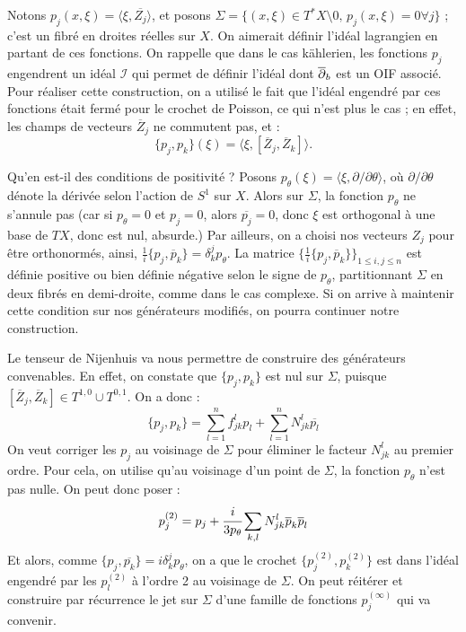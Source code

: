 Notons $p_j(x,\xi)= \langle \xi, \overline{Z_j} \rangle$, et posons
$\Sigma = \{(x,\xi) \in T^*X\setminus 0,\,p_j(x,\xi)=0 \forall j\}$ ;
c'est un fibré en droites réelles sur $X$. On aimerait définir l'idéal
lagrangien en partant de ces fonctions. On rappelle que dans le cas
kählerien, les fonctions $p_j$ engendrent un idéal $\mathcal{I}$ qui
permet de définir l'idéal dont $\overline{\partial}_b$ est un OIF associé. Pour réaliser
cette construction, on a utilisé le fait que l'idéal engendré par ces
fonctions était fermé pour le crochet de Poisson, ce qui n'est plus le
cas ; en effet, les champs de vecteurs $\overline{Z}_j$ ne commutent
pas, et :
\begin{equation*}
	\{p_j,p_k\}(\xi) = \langle \xi,
        [\overline{Z}_j,\overline{Z}_k]\rangle.
\end{equation*}

Qu'en est-il des conditions de positivité ? Posons $p_{\theta}(\xi) =
\langle \xi, \partial/\partial \theta \rangle$, où $\partial/\partial
\theta$ dénote la dérivée selon l'action de $S^1$ sur $X$. Alors sur
$\Sigma$, la fonction $p_{\theta}$ ne s'annule pas (car si
$p_{\theta}=0$ et $p_j=0$, alors $\overline{p_j}=0$, donc $\xi$ est
orthogonal à une base de $TX$, donc est nul, absurde.) Par ailleurs,
on a choisi nos vecteurs $Z_j$ pour être orthonormés, ainsi, $\frac 1i
\{p_j,\overline{p}_k\}=\delta^j_kp_{\theta}$. La matrice $\{\frac 1i
\{p_j,\overline{p}_k\}\}_{1\leq i,j\leq n}$ est définie positive ou bien définie négative selon le signe de $p_\theta$, partitionnant $\Sigma$ en deux fibrés en demi-droite, comme dans le cas complexe. Si on arrive à maintenir cette condition sur nos générateurs modifiés, on pourra continuer notre construction.

Le tenseur de Nijenhuis va nous permettre de construire des
générateurs convenables. En effet, on constate que $\{p_j,p_k\}$ est
nul sur $\Sigma$, puisque $[\overline{Z}_j,\overline{Z}_k]\in
T^{1,0}\cup T^{0,1}$. On a donc :
\begin{equation*}
	\{p_j,p_k\} = \sum_{l=1}^nf^l_{jk}p_l + \sum_{l=1}^{n}N^l_{jk}\overline{p_l}
\end{equation*}
On veut corriger les $p_j$ au voisinage de $\Sigma$ pour éliminer le facteur $N^l_{jk}$ au premier ordre. Pour cela, on utilise qu'au voisinage d'un point de $\Sigma$, la fonction $p_{\theta}$ n'est pas nulle. On peut donc poser :
\begin{equation*}
	p_j^{(2)} = p_j + \cfrac{i}{3p_{\theta}}\sum_{k,l}N^l_{jk}\overline{p}_k\overline{p}_l
\end{equation*}
Et alors, comme $\{p_j,\overline{p_k}\}=i\delta^j_k p_{\theta}$, on a que le crochet $\{p_j^{(2)},p_k^{(2)} \}$ est dans l'idéal engendré par les $p_l^{(2)}$ à l'ordre 2 au voisinage de $\Sigma$. On peut réitérer et construire par récurrence le jet sur $\Sigma$ d'une famille de fonctions $p^{(\infty)}_j$ qui va convenir.


